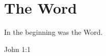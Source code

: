 \documentclass{memoir}
\begin{document}
\chapter{The Word}
\epigraph{In the beginning was the Word.}{John 1:1}
\lipsum
\end{document}
